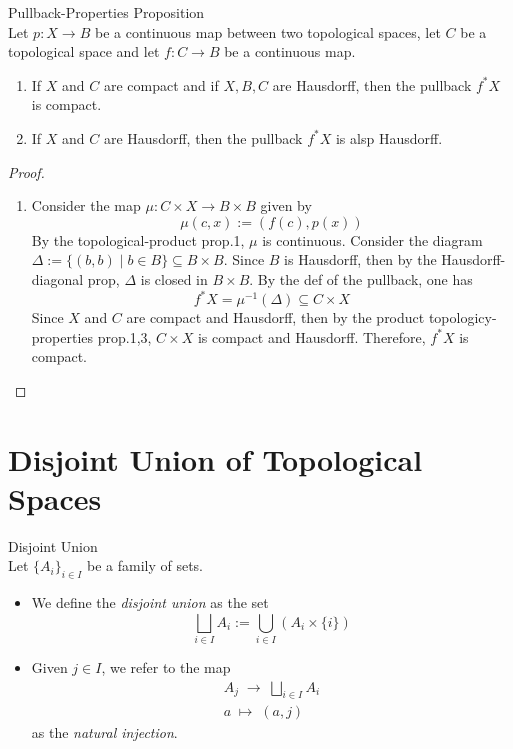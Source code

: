 \begin{proposition}{Pullback-Properties Proposition}\\
Let $p:X \to B$ be a continuous map between two topological spaces, let $C$ be a topological space and let $f: C\to B$ be a continuous map.
\begin{enumerate}
    \item If $X$ and $C$ are compact and if $X,B,C$ are Hausdorff, then the pullback $f^*X$ is compact.
    \item If $X$ and $C$ are Hausdorff, then the pullback $f^*X$ is alsp Hausdorff.
\end{enumerate}
\end{proposition}

\begin{proof}
    \begin{enumerate}
        \item Consider the map $\mu: C \times X \to B \times B$ given by
        $$\mu(c,x) := (f(c),p(x))$$
        By the topological-product prop.1, $\mu$ is continuous. Consider the diagram $\Delta := \{ (b,b) \mid b \in B \} \subseteq B \times B$. Since $B$ is Hausdorff, then by the Hausdorff-diagonal prop, $\Delta$ is closed in $B \times B$. By the def of the pullback, one has
        $$f^*X = \mu^{-1} (\Delta) \subseteq C \times X$$
        Since $X$ and $C$ are compact and Hausdorff, then by the product topologicy-properties prop.1,3, $C \times X$ is compact and Hausdorff. Therefore, $f^*X$ is compact.
    \end{enumerate}
\end{proof}

\section{Disjoint Union of Topological Spaces}

\begin{definition}{Disjoint Union}\\
Let $\{A_i\}_{i \in I}$ be a family of sets.
\begin{itemize}
    \item We define the \textit{disjoint union} as the set
    $$\bigsqcup_{i \in I} A_i := \bigcup_{i \in I} (A_i \times \{ i\})$$
    \item Given $j \in I$, we refer to the map
    $$\substack{A_j \;\to\; \bigsqcup_{i \in I}A_i\\
    a \;\mapsto \; (a,j)}$$
    as the \textit{natural injection}.
\end{itemize}
\end{definition}

